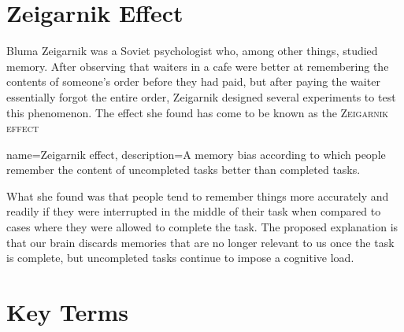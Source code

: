 \section{Zeigarnik Effect}

Bluma Zeigarnik was a Soviet psychologist who, among other things, studied memory. After observing that waiters in a cafe were better at remembering the contents of someone's order before they had paid, but after paying the waiter essentially forgot the entire order, Zeigarnik designed several experiments to test this phenomenon.\cite{zeigarnik1927} The effect she found has come to be known as the \textsc{\Gls{Zeigarnik effect}}

{
name=Zeigarnik effect,
description={A memory bias according to which people remember the content of uncompleted tasks better than completed tasks.}
}

What she found was that people tend to remember things more accurately and readily if they were interrupted in the middle of their task when compared to cases where they were allowed to complete the task. The proposed explanation is that our brain discards memories that are no longer relevant to us once the task is complete, but uncompleted tasks continue to impose a cognitive load.

\section*{Key Terms}
\begin{fullwidth}
\begin{multicols}{2}
\begin{sortedlist}
\end{sortedlist}
\end{multicols}
\end{fullwidth}
